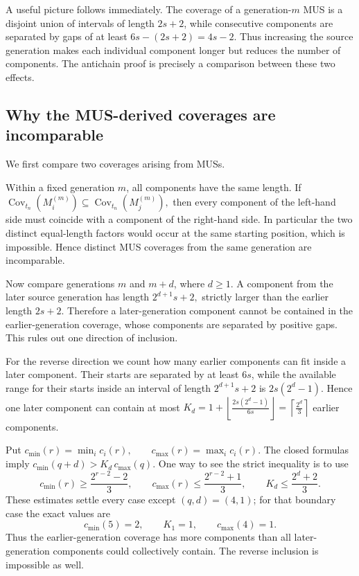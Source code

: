\documentclass[10pt,a4paper]{article}
\theoremstyle{definition}\newtheorem{definition}[theorem]{Definition}
\theoremstyle{remark}\newtheorem{remark}[theorem]{Remark}
\newcommand{\Cov}{\operatorname{Cov}}
\begin{document}
A useful picture follows immediately.  The coverage of a generation-$m$ MUS is a disjoint union of intervals of length $2s+2$, while consecutive components are separated by gaps of at least
$
 6s-(2s+2)=4s-2.
$
Thus increasing the source generation makes each individual component longer but reduces the number of components.  The antichain proof is precisely a comparison between these two effects.

\subsection{Why the MUS-derived coverages are incomparable}
\label{subsec:mus-antichain}

We first compare two coverages arising from MUSs.

Within a fixed generation $m$, all components have the same length.  If
$
 \Cov_{t_n}(M_i^{(m)})
   \subseteq
 \Cov_{t_n}(M_j^{(m)}),
$
then every component of the left-hand side must coincide with a component of the right-hand side.  In particular the two distinct equal-length factors would occur at the same starting position, which is impossible.  Hence distinct MUS coverages from the same generation are incomparable.

Now compare generations $m$ and $m+d$, where $d\ge1$.  A component from the later source generation has length
$
 2^{d+1}s+2,
$
strictly larger than the earlier length $2s+2$.  Therefore a later-generation component cannot be contained in the earlier-generation coverage, whose components are separated by positive gaps.  This rules out one direction of inclusion.

For the reverse direction we count how many earlier components can fit inside a later component.  Their starts are separated by at least $6s$, while the available range for their starts inside an interval of length $2^{d+1}s+2$ is
$
 2s(2^d-1).
$
Hence one later component can contain at most
$
 K_d
 =1+\left\lfloor\frac{2s(2^d-1)}{6s}\right\rfloor
 =\left\lceil\frac{2^d}{3}\right\rceil
$
earlier components.

Put
$
 c_{\min}(r)=\min_i c_i(r),
 \qquad
 c_{\max}(r)=\max_i c_i(r).
$
The closed formulas imply
$
 c_{\min}(q+d)>K_d\,c_{\max}(q).
$
One way to see the strict inequality is to use
\[
 c_{\min}(r)\ge\frac{2^{r-2}-2}{3},
 \qquad
 c_{\max}(r)\le\frac{2^{r-2}+1}{3},
 \qquad
 K_d\le\frac{2^d+2}{3}.
\]
These estimates settle every case except $(q,d)=(4,1)$; for that boundary case the exact values are
\[
 c_{\min}(5)=2,
 \qquad
 K_1=1,
 \qquad
 c_{\max}(4)=1.
\]
Thus the earlier-generation coverage has more components than all later-generation components could collectively contain.  The reverse inclusion is impossible as well.
\end{document}
